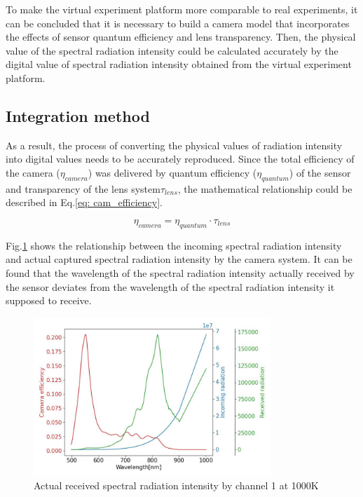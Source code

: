 To make the virtual experiment platform more comparable to real experiments, 
it can be concluded that it is necessary to build a camera model that 
incorporates the effects of sensor quantum efficiency and lens transparency.
Then, the physical value of the spectral radiation intensity could be 
calculated accurately by the digital value of spectral radiation intensity obtained from the virtual experiment 
platform.


\subsection{Integration method}
As a result, the process of converting the physical values of radiation intensity 
into digital values needs to be accurately reproduced. Since the total efficiency 
of the camera (${\eta}_{camera}$) was delivered by quantum efficiency (${\eta}_{quantum}$)
of the sensor and transparency of the lens system{$\tau_{lens}$}, the mathematical
relationship could be described in Eq.\ref{eq: cam_efficiency}.


\begin{equation}
    \label{eq: cam_efficiency}
    {\eta}_{camera} = {\eta}_{quantum} \cdot \tau_{lens}
\end{equation}


Fig.\ref{fig: received} shows the relationship between the incoming spectral 
radiation intensity and actual captured spectral radiation intensity 
by the camera system. It can be found that the wavelength of the spectral 
radiation intensity actually received by the sensor deviates from the wavelength of the 
spectral radiation intensity it supposed to receive.


\begin{figure}[htbp]
    \centering
    \includegraphics[width = 0.8\textwidth]{figures/received_radiation.jpg}
    \caption{Actual received spectral radiation intensity by channel 1 at 1000K}
    \label{fig: received}
\end{figure}


